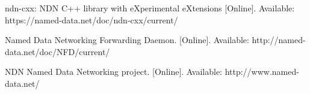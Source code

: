 \documentclass[11pt,conference]{./IEEEtran}
\begin{document}
\begin{thebibliography}{99}










ndn-cxx: NDN C++ library with eXperimental eXtensions [Online]. Available:
https://named-data.net/doc/ndn-cxx/current/

Named Data Networking Forwarding Daemon. [Online]. Available:
http://named-data.net/doc/NFD/current/

NDN Named Data Networking project. [Online]. Available:
http://www.named-data.net/




\end{thebibliography}
\end{document}
